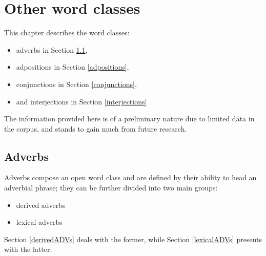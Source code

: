 

\chapter{Other word classes}\label{otherWordClasses}
This chapter describes the word classes:
\begin{itemize}
\item{adverbs in Section \ref{adverbs},}
\item{adpositions in Section \ref{adpositions},}
\item{conjunctions in Section \ref{conjunctions},}
\item{and interjections in Section \ref{interjections}}
\end{itemize}
The information provided here is of a preliminary nature due to limited data in the corpus, and stands to gain much from future research. %


\section{Adverbs}\label{adverbs}
Adverbs compose an open word class and are defined by their ability to head an adverbial phrase; they can be further divided into two main groups: 
\begin{itemize}
\item{derived adverbs}
\item{lexical adverbs}
\end{itemize}
Section \ref{derivedADVs} deals with the former, while Section \ref{lexicalADVs} presents with the latter. 

